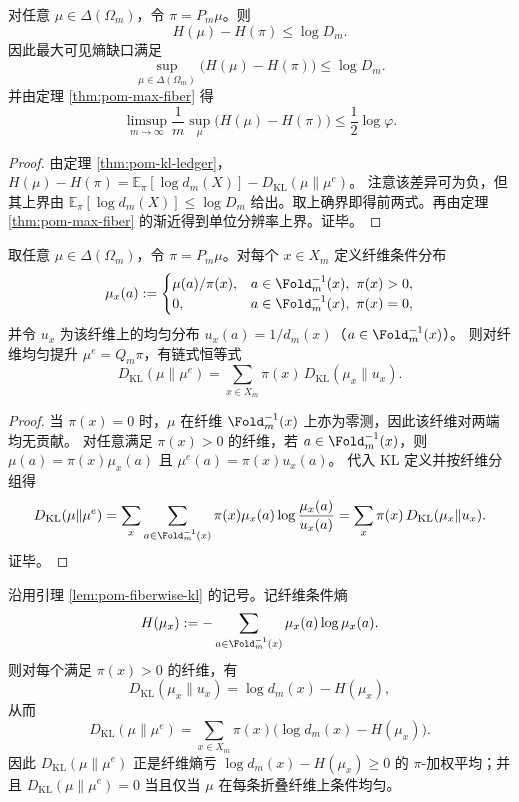 \begin{corollary}[最坏熵缺口上界]\label{cor:pom-entropy-gap-bound}
对任意 $\mu\in\Delta(\Omega_m)$，令 $\pi=P_m\mu$。则
\[
H(\mu)-H(\pi)\le \log D_m.
\]
因此最大可见熵缺口满足
\[
\sup_{\mu\in\Delta(\Omega_m)}\bigl(H(\mu)-H(\pi)\bigr)\le \log D_m.
\]
并由定理 \ref{thm:pom-max-fiber} 得
\[
\limsup_{m\to\infty}\frac{1}{m}\sup_{\mu}\bigl(H(\mu)-H(\pi)\bigr)\le \frac12\log\varphi.
\]
\end{corollary}
\begin{proof}
由定理 \ref{thm:pom-kl-ledger}，
\(
H(\mu)-H(\pi)=\mathbb{E}_{\pi}[\log d_m(X)]-D_{\mathrm{KL}}(\mu\|\mu^e)
\)。
注意该差异可为负，但其上界由 $\mathbb{E}_{\pi}[\log d_m(X)]\le \log D_m$ 给出。取上确界即得前两式。再由定理 \ref{thm:pom-max-fiber} 的渐近得到单位分辨率上界。证毕。
\end{proof}

\begin{lemma}[纤维 KL 分解：残差为纤维内非均匀的平均]\label{lem:pom-fiberwise-kl}
取任意 $\mu\in\Delta(\Omega_m)$，令 $\pi=P_m\mu$。对每个 $x\in X_m$ 定义纤维条件分布
\[
\mu_x(a):=
\begin{cases}
\mu(a)/\pi(x),& a\in \Fold_m^{-1}(x),\ \pi(x)>0,\\
0,& a\in \Fold_m^{-1}(x),\ \pi(x)=0,
\end{cases}
\]
并令 $u_x$ 为该纤维上的均匀分布 $u_x(a)=1/d_m(x)$（$a\in\Fold_m^{-1}(x)$）。
则对纤维均匀提升 $\mu^e=Q_m\pi$，有链式恒等式
\[
\boxed{\;
D_{\mathrm{KL}}(\mu\|\mu^e)=\sum_{x\in X_m}\pi(x)\,D_{\mathrm{KL}}(\mu_x\|u_x).
\;}
\]
\end{lemma}
\begin{proof}
当 $\pi(x)=0$ 时，$\mu$ 在纤维 $\Fold_m^{-1}(x)$ 上亦为零测，因此该纤维对两端均无贡献。
对任意满足 $\pi(x)>0$ 的纤维，若 $a\in\Fold_m^{-1}(x)$，则
\(
\mu(a)=\pi(x)\mu_x(a)
\)
且
\(
\mu^e(a)=\pi(x)u_x(a)
\)。
代入 KL 定义并按纤维分组得
\[
D_{\mathrm{KL}}(\mu\|\mu^e)
=\sum_{x}\sum_{a\in\Fold_m^{-1}(x)}\pi(x)\mu_x(a)\log\frac{\mu_x(a)}{u_x(a)}
=\sum_x \pi(x)\,D_{\mathrm{KL}}(\mu_x\|u_x).
\]
证毕。
\end{proof}

\begin{corollary}\label{cor:pom-fiber-entropy-deficit}
沿用引理 \ref{lem:pom-fiberwise-kl} 的记号。记纤维条件熵
\[
H(\mu_x):=-\sum_{a\in\Fold_m^{-1}(x)}\mu_x(a)\log \mu_x(a).
\]
则对每个满足 $\pi(x)>0$ 的纤维，有
\[
D_{\mathrm{KL}}(\mu_x\|u_x)=\log d_m(x)-H(\mu_x),
\]
从而
\[
\boxed{\;
D_{\mathrm{KL}}(\mu\|\mu^e)
=\sum_{x\in X_m}\pi(x)\bigl(\log d_m(x)-H(\mu_x)\bigr).
\;}
\]
因此 $D_{\mathrm{KL}}(\mu\|\mu^e)$ 正是纤维熵亏 \(\log d_m(x)-H(\mu_x)\ge 0\) 的 \(\pi\)-加权平均；并且 $D_{\mathrm{KL}}(\mu\|\mu^e)=0$ 当且仅当 $\mu$ 在每条折叠纤维上条件均匀。
\end{corollary}

